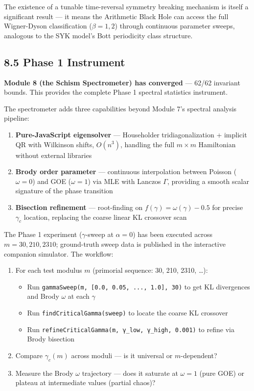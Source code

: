 \documentclass[
  11pt,
]{article}
\providecommand{\tightlist}{%
  \setlength{\itemsep}{0pt}\setlength{\parskip}{0pt}}
\numberwithin{equation}{section}
\begin{document}
The existence of a tunable time-reversal symmetry breaking mechanism is
itself a significant result --- it means the Arithmetic Black Hole can
access the full Wigner-Dyson classification (\(\beta = 1, 2\)) through
continuous parameter sweeps, analogous to the SYK model's Bott
periodicity class structure.

\subsection{8.5 Phase 1 Instrument}\label{phase-1-instrument}

\textbf{Module 8 (the Schism Spectrometer) has converged} --- 62/62
invariant bounds. This provides the complete Phase 1 spectral statistics
instrument.

The spectrometer adds three capabilities beyond Module 7's spectral
analysis pipeline:

\begin{enumerate}
\def\labelenumi{\arabic{enumi}.}
\tightlist
\item
  \textbf{Pure-JavaScript eigensolver} --- Householder
  tridiagonalization + implicit QR with Wilkinson shifts, \(O(n^3)\),
  handling the full \(m \times m\) Hamiltonian without external
  libraries
\item
  \textbf{Brody order parameter} --- continuous interpolation between
  Poisson (\(\omega = 0\)) and GOE (\(\omega = 1\)) via MLE with Lanczos
  \(\Gamma\), providing a smooth scalar signature of the phase
  transition
\item
  \textbf{Bisection refinement} --- root-finding on
  \(f(\gamma) = \omega(\gamma) - 0.5\) for precise \(\gamma_c\)
  location, replacing the coarse linear KL crossover scan
\end{enumerate}

The Phase 1 experiment (\(\gamma\)-sweep at \(\alpha = 0\)) has been
executed across \(m = 30, 210, 2310\); ground-truth sweep data is
published in the interactive companion simulator. The workflow:

\begin{enumerate}
\def\labelenumi{\arabic{enumi}.}
\tightlist
\item
  For each test modulus \(m\) (primorial sequence: 30, 210, 2310,
  \ldots):

  \begin{itemize}
  \tightlist
  \item
    Run \texttt{gammaSweep(m,\ {[}0.0,\ 0.05,\ ...,\ 1.0{]},\ 30)} to
    get KL divergences and Brody \(\omega\) at each \(\gamma\)
  \item
    Run \texttt{findCriticalGamma(sweep)} to locate the coarse KL
    crossover
  \item
    Run \texttt{refineCriticalGamma(m,\ γ\_low,\ γ\_high,\ 0.001)} to
    refine via Brody bisection
  \end{itemize}
\item
  Compare \(\gamma_c(m)\) across moduli --- is it universal or
  \(m\)-dependent?
\item
  Measure the Brody \(\omega\) trajectory --- does it saturate at
  \(\omega = 1\) (pure GOE) or plateau at intermediate values (partial
  chaos)?
\end{enumerate}
\end{document}
